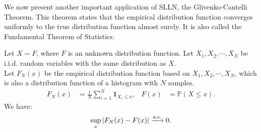\documentclass{huhtakm-template-book-v2}
\newcommand{\prob}{\mathbb{P}}
\begin{document}
    We now present another important application of SLLN, the Glivenko-Cantelli Theorem. This theorem states that the empirical distribution function converges uniformly to the true distribution function almost surely. It is also called the Fundamental Theorem of Statistics.
    \begin{thm}
        Let $X \sim F$, where $F$ is an unknown distribution function.
        Let $X_{1},X_{2},\cdots,X_{N}$ be i.i.d. random variables with the same distribution as $X$.\\
        Let $F_{N}(x)$ be the empirical distribution function based on $X_{1},X_{2},\cdots,X_{N}$, which is also a distribution function of a histogram with $N$ samples.
        \begin{align*}
            F_{N}(x) &= \frac{1}{N}\sum_{i = 1}^{N}\mathbf{1}_{X_{i} \leq x}, & F(x) &= \prob(X \leq x).
        \end{align*}
        We have:
        \begin{equation*}
            \sup_{x}\left|{F_{N}(x)-F(x)}\right| \xrightarrow{\text{a.s.}} 0.
        \end{equation*}
    \end{thm}
\end{document}
